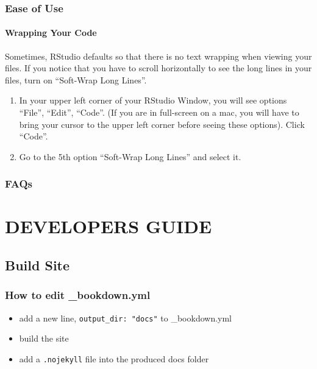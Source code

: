 \documentclass[
]{book}
\providecommand{\tightlist}{%
  \setlength{\itemsep}{0pt}\setlength{\parskip}{0pt}}
\theoremstyle{definition}
\theoremstyle{definition}
\theoremstyle{definition}
\theoremstyle{definition}
\theoremstyle{remark}
\begin{document}
\section{Ease of Use}\label{ease-of-use}

\subsection{Wrapping Your Code}\label{wrapping-your-code}

Sometimes, RStudio defaults so that there is no text wrapping when viewing your files. If you notice that you have to scroll horizontally to see the long lines in your files, turn on ``Soft-Wrap Long Lines''.

\begin{enumerate}
\def\labelenumi{\arabic{enumi}.}
\item
  In your upper left corner of your RStudio Window, you will see options ``File'', ``Edit'', ``Code''. (If you are in full-screen on a mac, you will have to bring your cursor to the upper left corner before seeing these options). Click ``Code''.
\item
  Go to the 5th option ``Soft-Wrap Long Lines'' and select it.
\end{enumerate}

\section{FAQs}\label{faqs}

\part{DEVELOPERS GUIDE}\label{part-developers-guide}

\chapter{Build Site}\label{build-site}

\section{How to edit \_bookdown.yml}\label{how-to-edit-_bookdown.yml}

\begin{itemize}
\tightlist
\item
  add a new line, \texttt{output\_dir:\ "docs"} to \_bookdown.yml
\item
  build the site
\item
  add a \texttt{.nojekyll} file into the produced docs folder
\end{itemize}
\end{document}
